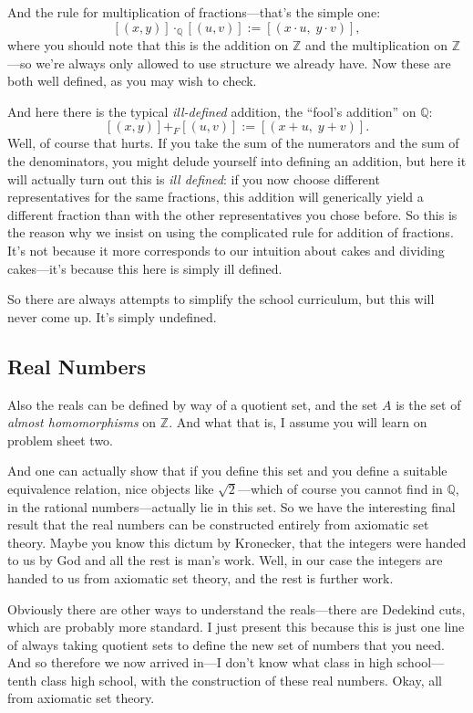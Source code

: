 And the rule for multiplication of fractions---that's the simple one:
\[
[(x, y)] \cdot_{\mathbb{Q}} [(u, v)] := [(x \cdot u,\; y \cdot v)],
\]
where you should note that this is the addition on $\mathbb{Z}$ and the multiplication on $\mathbb{Z}$---so we're always only allowed to use structure we already have. Now these are both well defined, as you may wish to check.

And here there is the typical \emph{ill-defined} addition, the ``fool's addition'' on $\mathbb{Q}$:
\[
[(x, y)] +_F [(u, v)] := [(x + u,\; y + v)].
\]
Well, of course that hurts. If you take the sum of the numerators and the sum of the denominators, you might delude yourself into defining an addition, but here it will actually turn out this is \emph{ill defined}: if you now choose different representatives for the same fractions, this addition will generically yield a different fraction than with the other representatives you chose before. So this is the reason why we insist on using the complicated rule for addition of fractions. It's not because it more corresponds to our intuition about cakes and dividing cakes---it's because this here is simply ill defined.

So there are always attempts to simplify the school curriculum, but this will never come up. It's simply undefined.

\subsection*{Real Numbers}

Also the reals can be defined by way of a quotient set, and the set $A$ is the set of \emph{almost homomorphisms} on $\mathbb{Z}$. And what that is, I assume you will learn on problem sheet two.

And one can actually show that if you define this set and you define a suitable equivalence relation, nice objects like $\sqrt{2}$---which of course you cannot find in $\mathbb{Q}$, in the rational numbers---actually lie in this set. So we have the interesting final result that the real numbers can be constructed entirely from axiomatic set theory. Maybe you know this dictum by Kronecker, that the integers were handed to us by God and all the rest is man's work. Well, in our case the integers are handed to us from axiomatic set theory, and the rest is further work.

Obviously there are other ways to understand the reals---there are Dedekind cuts, which are probably more standard. I just present this because this is just one line of always taking quotient sets to define the new set of numbers that you need. And so therefore we now arrived in---I don't know what class in high school---tenth class high school, with the construction of these real numbers. Okay, all from axiomatic set theory.


